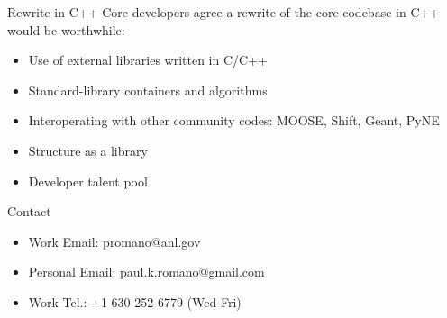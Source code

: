 \documentclass[noamssymb,svgnames]{beamer}
\begin{document}
\begin{frame}{Rewrite in C++}
  Core developers agree a rewrite of the core codebase in C++ would be
  worthwhile:
  \begin{itemize}
  \item Use of external libraries written in C/C++
  \item Standard-library containers and algorithms
  \item Interoperating with other community codes: MOOSE, Shift, Geant, PyNE
  \item Structure as a library
  \item Developer talent pool
  \end{itemize}
\end{frame}

\begin{frame}{Contact}
  \begin{itemize}
  \item Work Email: promano@anl.gov
  \item Personal Email: paul.k.romano@gmail.com
  \item Work Tel.: +1 630 252-6779 (Wed-Fri)
  \end{itemize}
\end{frame}
\end{document}
